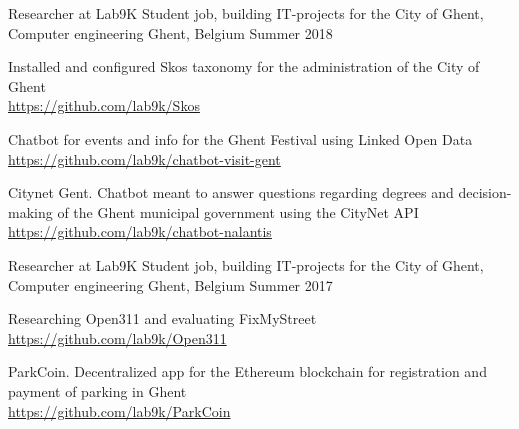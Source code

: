 

\begin{cventries}

  \cventry
    {Researcher at Lab9K} %
    {Student job, building IT-projects for the City of Ghent, Computer engineering} %
    {Ghent, Belgium} %
    {Summer 2018} %
    {
      \begin{cvitems} %
        \item Installed and configured Skos taxonomy for the administration of the City of Ghent \\
        \url{https://github.com/lab9k/Skos}
  		\item Chatbot for events and info for the Ghent Festival using Linked Open Data \\ 
  	    \url{https://github.com/lab9k/chatbot-visit-gent}
  		\item Citynet Gent. Chatbot meant to answer questions regarding degrees and decision-making of the 
  	    Ghent municipal government using the CityNet API \\ 
  		\url{https://github.com/lab9k/chatbot-nalantis}
      \end{cvitems}
    }

  \cventry
    {Researcher at Lab9K} %
    {Student job, building IT-projects for the City of Ghent, Computer engineering} %
    {Ghent, Belgium} %
    {Summer 2017} %
    {
      \begin{cvitems} %
        \item Researching Open311 and evaluating FixMyStreet \\
        \url{https://github.com/lab9k/Open311}
        \item ParkCoin. Decentralized app for the Ethereum blockchain for registration and payment of parking in Ghent \\ 
  	    \url{https://github.com/lab9k/ParkCoin}
      \end{cvitems}
    }

\end{cventries}
